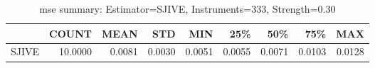 \begin{table}[ht]
\centering
\caption{mse summary: Estimator=SJIVE, Instruments=333, Strength=0.30}
\begin{tabular}{lrrrrrrrr}
\toprule
 & COUNT & MEAN & STD & MIN & 25\% & 50\% & 75\% & MAX \\
\midrule
SJIVE & 10.0000 & 0.0081 & 0.0030 & 0.0051 & 0.0055 & 0.0071 & 0.0103 & 0.0128 \\
\bottomrule
\end{tabular}
\end{table}
